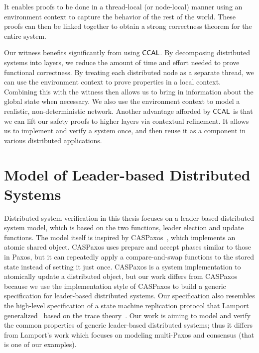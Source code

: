 It enables proofs to be done in a thread-local (or node-local) manner using an environment context to
capture the behavior of the rest of the world.
These proofs can then be linked together to obtain a strong correctness theorem for the entire system.

Our witness benefits significantly from using $\mathsf{CCAL}$.
By decomposing distributed systems into layers, we reduce the amount of time and effort needed to
prove functional correctness.
By treating each distributed node as a separate thread, we can use the environment context to
prove properties in a local context.
Combining this with the witness then allows us to bring in information about the global state when necessary.
We also use the environment context to model a realistic, non-deterministic network.
Another advantage afforded by $\mathsf{CCAL}$ is that we can lift our safety proofs to higher layers via contextual refinement.
It allows us to implement and verify a system once, and then reuse it as a component in various distributed applications.



\section{Model of Leader-based Distributed Systems}
\label{chatper:related:sec:model-of-leader-based-distributed-systems}

Distributed system verification in this thesis focuses on a leader-based distributed system model, 
which is based on the two functions,
leader election and update functions. 
The model itself is inspired by CASPaxos~\cite{caspaxos},
which implements an atomic shared object. 
CASPaxos uses prepare and accept
phases similar to those in Paxos, but it can repeatedly apply a compare-and-swap
functions to the stored state instead of setting it just once. 
CASPaxos is a system implementation
to atomically update a distributed object, but our work differs from CASPaxos 
because we use the implementation style of
CASPaxos to build a generic specification for leader-based distributed systems.
Our specification also resembles the high-level specification of a state machine
replication protocol that Lamport generalized~\cite{generalizedconsensus} based on the trace theory~\cite{mazurkiewicz:tracetheory}.
Our work is aiming to model and verify the common properties of  generic leader-based distributed systems;
thus it differs from Lamport's work which focuses on modeling multi-Paxos and consensus (that is one of our examples).

